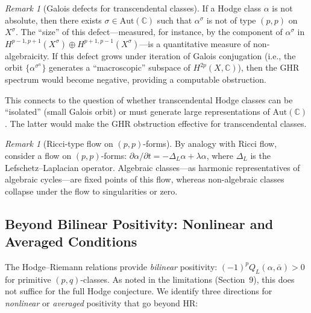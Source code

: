 \documentclass[aps,prd,twocolumn,superscriptaddress,nofootinbib]{revtex4-2}
\theoremstyle{definition}
\theoremstyle{remark}
\newtheorem{remark}[theorem]{Remark}
\begin{document}
\begin{remark}[Galois defects for transcendental classes]
\label{rem:galois-defects}
If a Hodge class $\alpha$ is not absolute, then there exists $\sigma \in \mathrm{Aut}(\mathbb{C})$ such that $\alpha^\sigma$ is not of type $(p,p)$ on $X^\sigma$. The ``size'' of this defect---measured, for instance, by the component of $\alpha^\sigma$ in $H^{p-1,p+1}(X^\sigma) \oplus H^{p+1,p-1}(X^\sigma)$---is a quantitative measure of non-algebraicity. If this defect grows under iteration of Galois conjugation (i.e., the orbit $\{\alpha^{\sigma^n}\}$ generates a ``macroscopic'' subspace of $H^{2p}(X, \mathbb{C})$), then the GHR spectrum would become negative, providing a computable obstruction.

This connects to the question of whether transcendental Hodge classes can be ``isolated'' (small Galois orbit) or must generate large representations of $\mathrm{Aut}(\mathbb{C})$. The latter would make the GHR obstruction effective for transcendental classes.
\end{remark}

\begin{remark}[Ricci-type flow on $(p,p)$-forms]
\label{rem:ricci-flow}
By analogy with Ricci flow, consider a flow on $(p,p)$-forms: $\partial \alpha / \partial t = -\Delta_L \alpha + \lambda \alpha$, where $\Delta_L$ is the Lefschetz--Laplacian operator. Algebraic classes---as harmonic representatives of algebraic cycles---are fixed points of this flow, whereas non-algebraic classes collapse under the flow to singularities or zero.
\end{remark}


\subsection{Beyond Bilinear Positivity: Nonlinear and Averaged Conditions}
\label{sec:nonlinear-positivity}

The Hodge--Riemann relations provide \emph{bilinear} positivity: $(-1)^p Q_L(\alpha, \bar\alpha) > 0$ for primitive $(p,q)$-classes. As noted in the limitations (Section~9), this does not suffice for the full Hodge conjecture. We identify three directions for \emph{nonlinear} or \emph{averaged} positivity that go beyond HR:
\end{document}
